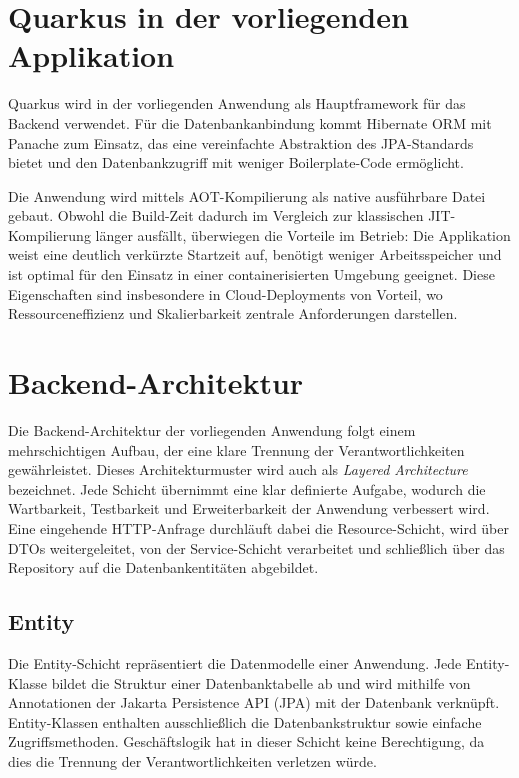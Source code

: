 \section{Quarkus in der vorliegenden Applikation}

Quarkus wird in der vorliegenden Anwendung als Hauptframework für das Backend verwendet. 
Für die Datenbankanbindung kommt Hibernate ORM mit Panache zum Einsatz, das eine 
vereinfachte Abstraktion des JPA-Standards bietet und den Datenbankzugriff mit weniger 
Boilerplate-Code ermöglicht.

Die Anwendung wird mittels AOT-Kompilierung als native ausführbare Datei gebaut. 
Obwohl die Build-Zeit dadurch im Vergleich zur klassischen JIT-Kompilierung länger 
ausfällt, überwiegen die Vorteile im Betrieb: Die Applikation weist eine deutlich 
verkürzte Startzeit auf, benötigt weniger Arbeitsspeicher und ist optimal für den 
Einsatz in einer containerisierten Umgebung geeignet. Diese Eigenschaften sind 
insbesondere in Cloud-Deployments von Vorteil, wo Ressourceneffizienz und 
Skalierbarkeit zentrale Anforderungen darstellen.
\section{Backend-Architektur}

Die Backend-Architektur der vorliegenden Anwendung folgt einem mehrschichtigen Aufbau,
der eine klare Trennung der Verantwortlichkeiten gewährleistet. Dieses Architekturmuster
wird auch als \textit{Layered Architecture} bezeichnet. Jede Schicht übernimmt eine
klar definierte Aufgabe, wodurch die Wartbarkeit, Testbarkeit und Erweiterbarkeit
der Anwendung verbessert wird. Eine eingehende HTTP-Anfrage durchläuft dabei die
Resource-Schicht, wird über DTOs weitergeleitet, von der Service-Schicht verarbeitet
und schließlich über das Repository auf die Datenbankentitäten abgebildet.

\subsection{Entity}

Die Entity-Schicht repräsentiert die Datenmodelle einer Anwendung. Jede Entity-Klasse
bildet die Struktur einer Datenbanktabelle ab und wird mithilfe von Annotationen der
Jakarta Persistence API (JPA) mit der Datenbank verknüpft. Entity-Klassen enthalten
ausschließlich die Datenbankstruktur sowie einfache Zugriffsmethoden. Geschäftslogik
hat in dieser Schicht keine Berechtigung, da dies die Trennung der Verantwortlichkeiten
verletzen würde.

